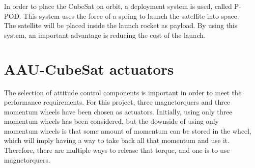 In order to place the CubeSat on orbit, a deployment system is used, called P-POD. This system uses the force of a spring to launch the satellite into space. The satellite will be placed inside the launch rocket as payload. By using this system, an important advantage is reducing the cost of the launch. \cite{PPOD}
%
\section{AAU-CubeSat actuators}
The selection of attitude control components is important in order to meet the performance requirements. For this project, three magnetorquers and three momentum wheels have been chosen as actuators. Initially, using only three momentum wheels has been considered, but the downside of using only momentum wheels is that some amount of momentum can be stored in the wheel, which will imply having a way to take back all that momentum and use it. Therefore, there are multiple ways to release that torque, and one is to use magnetorquers. 

